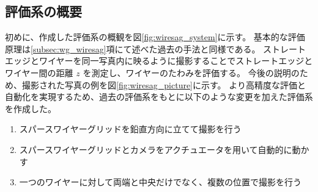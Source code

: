 \documentclass[../../main.tex]{subfiles}
\begin{document}
\subsection{評価系の概要}
初めに、作成した評価系の概観を図\ref{fig:wiresag_system}に示す。
基本的な評価原理は\ref{subsec:wg_wiresag}項にて述べた過去の手法と同様である。
ストレートエッジとワイヤーを同一写真内に映るように撮影することでストレートエッジとワイヤー間の距離 $z$ を測定し、ワイヤーのたわみを評価する。
今後の説明のため、撮影された写真の例を図\ref{fig:wiresag_picture}に示す。
より高精度な評価と自動化を実現するため、過去の評価系をもとに以下のような変更を加えた評価系を作成した。
\begin{enumerate}
    \item スパースワイヤーグリッドを鉛直方向に立てて撮影を行う
    \item スパースワイヤーグリッドとカメラをアクチュエータを用いて自動的に動かす
    \item 一つのワイヤーに対して両端と中央だけでなく、複数の位置で撮影を行う
\end{enumerate}
\end{document}
